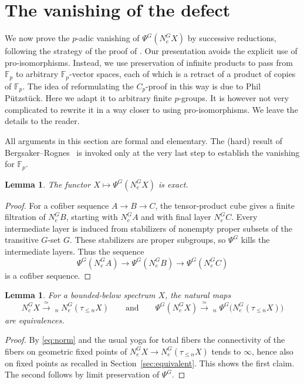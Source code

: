 \documentclass[11pt,a4paper]{article}
\newtheorem{lemma}[thm]{Lemma}
\theoremstyle{definition}
\newcommand{\Fp}{\mathbb F_p}
\newcommand{\invlim}{\mathop{\underleftarrow{\mathrm{lim}}}}
\newcommand{\NormG}{N_e^G}
\begin{document}
\section{The vanishing of the defect}\label{sec:def_norm}

We now prove the $p$-adic vanishing of $\Psi^G(\NormG X)$
by successive reductions, following the strategy of the proof of
\cite[Theorem~III.1.7]{NS}. Our presentation avoids the explicit use of pro-isomorphisms.
Instead, we use preservation of infinite products to pass from
$\mathbb F_p$ to arbitrary $\mathbb F_p$-vector spaces,
each of which is a retract of a product of copies of $\mathbb F_p$.
The idea of reformulating the $C_p$-proof
in this way is due to Phil Pützstück. Here we adapt it to arbitrary
finite $p$-groups. It is however not very complicated to rewrite it in a way closer to \cite{NS}  using pro-isomorphisms. We leave the details to the reader.

All arguments in this section are formal and elementary.
The (hard) result of Bergsaker--Rognes~\cite[Theorem~1.1]{BR} is invoked
only at the very last step to establish the vanishing for $\Fp$.

\begin{lemma}\label{lemma:exact}
The functor $X\mapsto\Psi^G(\NormG X)$ is exact.
\end{lemma}
\begin{proof}
For a cofiber sequence $A\to B\to C$, the tensor-product cube
gives a finite filtration of $\NormG B$, starting with $\NormG A$
and with final layer $\NormG C$. Every intermediate layer is induced
from stabilizers of nonempty proper subsets of the transitive $G$-set
$G$. These stabilizers are proper subgroups, so $\Psi^G$ kills the
intermediate layers. Thus the sequence
\[
 \Psi^G(\NormG A)\longrightarrow\Psi^G(\NormG B)
 \longrightarrow\Psi^G(\NormG C)
\]
is a cofiber sequence.
\end{proof}

\begin{lemma}\label{lem:postnikov}
For a bounded-below spectrum $X$, the natural maps
\[
 \NormG X\xrightarrow{\ \simeq\ }
 \invlim_n\NormG(\tau_{\le n}X) \qquad \text{and} \qquad   \Psi^G(\NormG X)\xrightarrow{\ \simeq\ }
 \invlim_n\Psi^G\bigl(\NormG(\tau_{\le n}X)\bigr)
\]
are equivalences. 
\end{lemma}
\begin{proof}
By \eqref{eq:norm} and the usual yoga for total fibers the connectivity of the fibers on geometric fixed points of $\NormG X \to \NormG(\tau_{\le n}X)$ tends to $\infty$, hence also on fixed points as recalled in Section~\ref{sec:equivalent}. This shows the first claim. The second follows by limit preservation of $\Psi^G$.  
\end{proof}
\end{document}
